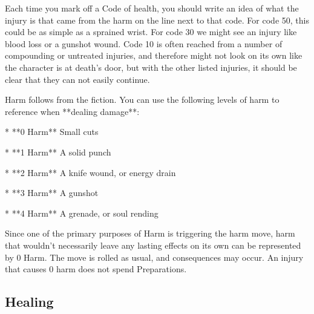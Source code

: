\documentclass[
  oneside,
  statementpaper,
  9pt]{memoir}
\begin{document}
\begin{Player}

Each time you mark off a Code of health, you should write an idea of what the injury is that came from the harm on the line next to that code. For code 50, this could be as simple as a sprained wrist. For code 30 we might see an injury like blood loss or a gunshot wound.  Code 10 is often reached from a number of compounding or untreated injuries, and therefore might not look on its own like the character is at death’s door, but with the other listed injuries, it should be clear that they can not easily continue.

\end{Player}

\begin{MC}

Harm follows from the fiction. You can use the following levels of harm to reference when **dealing damage**:

* **0 Harm** Small cuts

* **1 Harm** A solid punch

* **2 Harm** A knife wound, or energy drain

* **3 Harm** A gunshot

* **4 Harm** A grenade, or soul rending

Since one of the primary purposes of Harm is triggering the harm move, harm that wouldn’t necessarily leave any lasting effects on its own can be represented by 0 Harm. The move is rolled as usual, and consequences may occur. An injury that causes 0 harm does not spend Preparations.

\end{MC}

\hypertarget{healing}{%
\subsection{Healing}\label{healing}}
\end{document}
